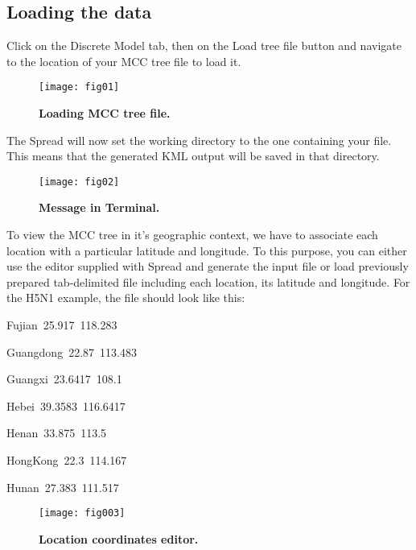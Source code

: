 \subsection{Loading the data}

Click on the Discrete Model tab, then on the Load tree file button
and navigate to the location of your MCC tree file to load it.

\begin{figure}[h!]
\begin{centering}
\texttt{[image: fig01]}
\caption{
{ \footnotesize 
{\bf Loading MCC tree file.}
} %
}
\label{fig:01}
\par\end{centering}
\end{figure}


The Spread will now set the working directory to the one containing
your file. This means that the generated KML output will be saved
in that directory.

\begin{figure}[h!]
\begin{centering}
\texttt{[image: fig02]}
\caption{
{ \footnotesize 
{\bf Message in Terminal.}
} %
}
\label{fig:02}
\par\end{centering}
\end{figure}

To view the MCC tree in it's geographic context, we have to associate
each location with a particular latitude and longitude. To this purpose,
you can either use the editor supplied with Spread and generate the
input file or load previously prepared tab-delimited file including
each location, its latitude and longitude. For the H5N1 example, the
file should look like this:

\begin{lyxcode}
Fujian~25.917~118.283

Guangdong~22.87~113.483

Guangxi~23.6417~108.1

Hebei~39.3583~116.6417

Henan~33.875~113.5

HongKong~22.3~114.167

Hunan~27.383~111.517
\end{lyxcode}

\begin{figure}[h!]
\begin{centering}
\texttt{[image: fig003]}
\caption{
{ \footnotesize 
{\bf Location coordinates editor.}
} %
}
\label{fig:003}
\par\end{centering}
\end{figure}


